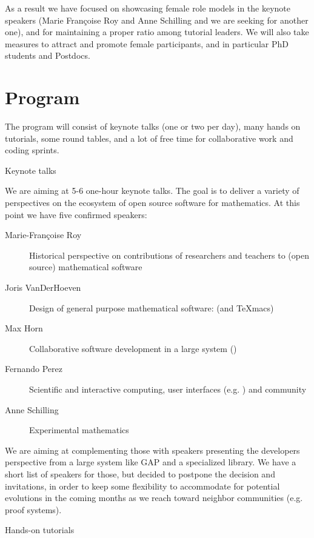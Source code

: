 \documentclass[12pt]{amsart}
\makeatletter
\def\subsection{\@startsection{subsection}{2}%
  \z@{.3\linespacing\@plus.5\linespacing}{.1\linespacing}%
  {\normalfont\bfseries}}
\makeatother
\begin{document}
As a result we have focused on showcasing female role models in the keynote
speakers (Marie Françoise Roy and Anne Schilling and we are seeking
for another one), and for maintaining a proper ratio among tutorial
leaders. We will also take measures to attract and promote female
participants, and in particular PhD students and Postdocs.

\section{Program}

The program will consist of keynote talks (one or two per day), many
hands on tutorials, some round tables, and a lot of free time for
collaborative work and coding sprints.

\subsection{Keynote talks}

We are aiming at 5-6 one-hour keynote talks. The goal is to deliver a
variety of perspectives on the ecosystem of open source software for
mathematics. At this point we have five confirmed speakers:

\begin{description}
\item[Marie-Françoise Roy] Historical perspective on contributions of
  researchers and teachers to (open source) mathematical software
\item[Joris VanDerHoeven] Design of general purpose mathematical software: \Mathemagix (and TeXmacs)
\item[Max Horn] Collaborative software development in a large system (\GAP)
\item[Fernando Perez] Scientific and interactive computing, user
  interfaces (e.g. \Jupyter) and community
\item[Anne Schilling] Experimental mathematics
\end{description}

We are aiming at complementing those with speakers presenting the
developers perspective from a large system like GAP and a specialized
library. We have a short list of speakers for those, but decided to
postpone the decision and invitations, in order to keep some
flexibility to accommodate for potential evolutions in the coming
months as we reach toward neighbor communities (e.g. proof systems).

\subsection{Hands-on tutorials}
\end{document}
